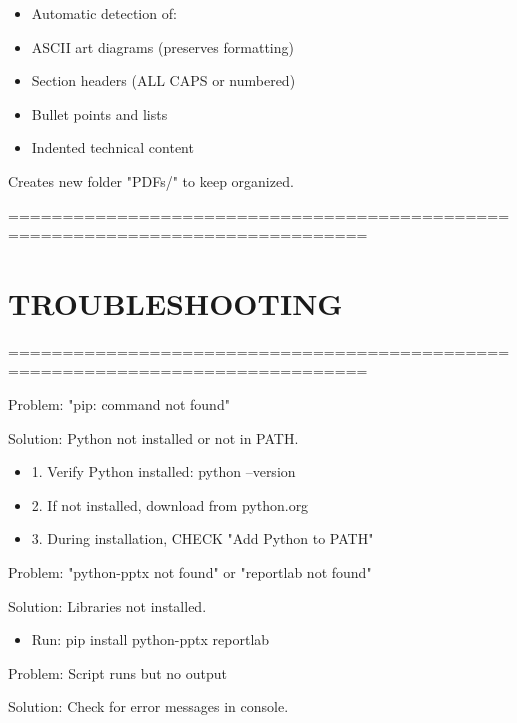 \documentclass[11pt,letterpaper]{article}
\begin{document}
\begin{itemize}
  \item Automatic detection of:
  \item ASCII art diagrams (preserves formatting)
  \item Section headers (ALL CAPS or numbered)
  \item Bullet points and lists
  \item Indented technical content
\end{itemize}

Creates new folder "PDFs/" to keep organized.\par

===============================================================================\par

\section{TROUBLESHOOTING}

===============================================================================\par

Problem: "pip: command not found"\par

Solution: Python not installed or not in PATH.\par

\begin{itemize}
  \item 1. Verify Python installed: python --version
  \item 2. If not installed, download from python.org
  \item 3. During installation, CHECK "Add Python to PATH"
\end{itemize}

Problem: "python-pptx not found" or "reportlab not found"\par

Solution: Libraries not installed.\par

\begin{itemize}
  \item Run: pip install python-pptx reportlab
\end{itemize}

Problem: Script runs but no output\par

Solution: Check for error messages in console.\par
\end{document}
